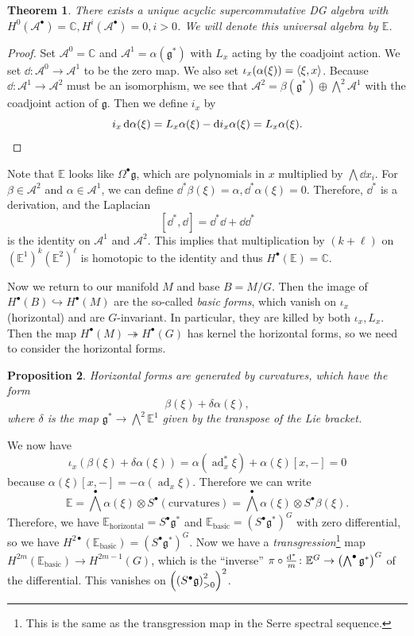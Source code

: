 \documentclass[leqno, openany]{memoir}
\newtheorem{thm}{Theorem}[section]
\newtheorem{prop}[thm]{Proposition}
\theoremstyle{definition}
\theoremstyle{remark}
\theoremstyle{plain}
\theoremstyle{definition}
\theoremstyle{remark}
\newcommand{\C}{\mathbb{C}}
\newcommand{\E}{\mathbb{E}}
\newcommand{\mc}[1]{\mathcal{#1}}
\newcommand{\mf}[1]{\mathfrak{#1}}
\DeclareMathOperator{\ad}{ad}
\begin{document}
\begin{thm}
    There exists a unique acyclic supercommutative DG algebra with $H^0(\mc{A}^{\bullet}) = \C, H^i(\mc{A}^{\bullet}) = 0, i > 0$. We will denote this universal algebra by $\mathbb{E}$.
\end{thm}

\begin{proof}
    Set $\mc{A}^0 = \C$ and $\mc{A}^1 = \alpha(\mf{g}^*)$ with $L_x$ acting by the coadjoint action. We set $\dd \colon \mc{A}^0 \to \mc{A}^1$ to be the zero map. We also set $\iota_x(\alpha(\xi)) = \ev{\xi, x}$. Because $\dd \colon \mc{A}^1 \to \mc{A}^2$ must be an isomorphism, we see that $\mc{A}^2 = \beta(\mf{g}^*) \oplus \bigwedge^2 \mc{A}^1$ with the coadjoint action of $\mf{g}$. Then we define $i_x$ by
    \[ i_x \dd{\alpha(\xi)} = L_x \alpha(\xi) - \dd i_x \alpha(\xi) = L_x \alpha(\xi). \qedhere \]
\end{proof}

Note that $\E$ looks like $\Omega^{\bullet} \mf{g}$, which are polynomials in $x$ multiplied by $\bigwedge \dd{x_i}$. For $\beta \in \mc{A}^2$ and $\alpha \in \mc{A}^1$, we can define $\dd^*{\beta}(\xi) = \alpha, \dd^* \alpha(\xi) = 0$. Therefore, $\dd^*$ is a derivation, and the Laplacian
\[ [\dd^*, \dd] = \dd^* \dd + \dd \dd^* \]
is the identity on $\mc{A}^1$ and $\mc{A}^2$. This implies that multiplication by $(k+\ell)$ on ${(\E^1)}^k {(\E^2)}^{\ell}$ is homotopic to the identity and thus $H^{\bullet}(\E) = \C$.

Now we return to our manifold $M$ and base $B = M/G$. Then the image of $H^{\bullet}(B) \hookrightarrow H^{\bullet}(M)$ are the so-called \textit{basic forms}, which vanish on $\iota_x$ (horizontal) and are $G$-invariant. In particular, they are killed by both $\iota_x, L_x$. Then the map $H^{\bullet}(M) \twoheadrightarrow H^{\bullet}(G)$ has kernel the horizontal forms, so we need to consider the horizontal forms.

\begin{prop}
    Horizontal forms are generated by \textit{curvatures}, which have the form 
    \[ \beta(\xi) + \delta \alpha(\xi), \]
    where $\delta$ is the map $\mf{g}^* \to \bigwedge^2 \E^1$ given by the transpose of the Lie bracket. 
\end{prop}

We now have
\[ \iota_x (\beta(\xi) + \delta \alpha(\xi)) = \alpha(\ad_x^* \xi) + \alpha(\xi) [x,-] = 0 \]
because $\alpha(\xi)[x,-] = -\alpha(\ad_x \xi)$. Therefore we can write
\[ \E = {\bigwedge}^{\bullet} \alpha(\xi) \otimes S^{\bullet}(\text{curvatures}) = {\bigwedge}^{\bullet} \alpha(\xi) \otimes S^{\bullet} \beta(\xi). \]
Therefore, we have $\E_{\text{horizontal}} = S^{\bullet} \mf{g}^*$ and $\E_{\text{basic}} = {(S^{\bullet} \mf{g}^*)}^G$ with zero differential, so we have $H^{2 \bullet}(\E_{\text{basic}}) = {(S^{\bullet} \mf{g}^*)}^G$. Now we have a \textit{transgression}\footnote{This is the same as the transgression map in the Serre spectral sequence.} map $H^{2 m}(\E_{\text{basic}}) \to H^{2 m-1}(G)$, which is the ``inverse'' $\pi \circ \frac{\dd^*}{m} \colon \E^G \to { \qty( \bigwedge^{\bullet} \mf{g}^* ) }^G$ of the differential. This vanishes on ${ \qty( { ( S^{\bullet} \mf{g} ) }^2_{>0} ) }^2$.
\end{document}

